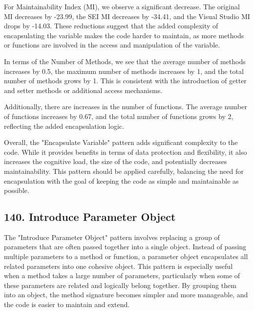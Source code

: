 For Maintainability Index (MI), we observe a significant decrease. The original MI decreases by -23.99, the SEI MI decreases by -34.41, and the Visual Studio MI drops by -14.03. These reductions suggest that the added complexity of encapsulating the variable makes the code harder to maintain, as more methods or functions are involved in the access and manipulation of the variable.

In terms of the Number of Methods, we see that the average number of methods increases by 0.5, the maximum number of methods increases by 1, and the total number of methods grows by 1. This is consistent with the introduction of getter and setter methods or additional access mechanisms.

Additionally, there are increases in the number of functions. The average number of functions increases by 0.67, and the total number of functions grows by 2, reflecting the added encapsulation logic.

Overall, the "Encapsulate Variable" pattern adds significant complexity to the code. While it provides benefits in terms of data protection and flexibility, it also increases the cognitive load, the size of the code, and potentially decreases maintainability. This pattern should be applied carefully, balancing the need for encapsulation with the goal of keeping the code as simple and maintainable as possible.

\subsection{140. Introduce Parameter Object}

The "Introduce Parameter Object" pattern involves replacing a group of parameters that are often passed together into a single object. Instead of passing multiple parameters to a method or function, a parameter object encapsulates all related parameters into one cohesive object. This pattern is especially useful when a method takes a large number of parameters, particularly when some of these parameters are related and logically belong together. By grouping them into an object, the method signature becomes simpler and more manageable, and the code is easier to maintain and extend.

